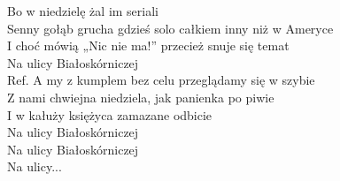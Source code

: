 \begin{flushleft}
Bo w niedzielę żal im seriali \\
\vskip 3mm
Senny gołąb grucha gdzieś solo całkiem inny niż w Ameryce \\
I choć mówią „Nic nie ma!”  przecież snuje się temat \\
Na ulicy Białoskórniczej \\
\vskip 3mm
Ref. A my z kumplem bez celu przeglądamy się w szybie\\
\hspace{0.9cm}Z nami chwiejna niedziela, jak panienka po piwie \\
\hspace{0.9cm}I w kałuży księżyca zamazane odbicie \\
\hspace{0.9cm}Na ulicy Białoskórniczej \\
\hspace{0.9cm}Na ulicy Białoskórniczej \\
\hspace{0.9cm}Na ulicy... \\
\end{flushleft}
\clearpage
